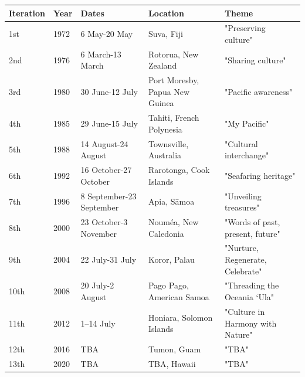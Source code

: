 \documentclass{article}
\begin{document}
\begin{tabular}{lllll}
\toprule
Iteration & Year & Dates & Location & Theme \\
\midrule
1st & 1972 & 6 May-20 May & Suva, Fiji & "Preserving culture" \\
2nd & 1976 & 6 March-13 March & Rotorua, New Zealand & "Sharing culture" \\
3rd & 1980 & 30 June-12 July & Port Moresby, Papua New Guinea & "Pacific awareness" \\
4th & 1985 & 29 June-15 July & Tahiti, French Polynesia & "My Pacific" \\
5th & 1988 & 14 August-24 August & Townsville, Australia & "Cultural interchange" \\
6th & 1992 & 16 October-27 October & Rarotonga, Cook Islands & "Seafaring heritage" \\
7th & 1996 & 8 September-23 September & Apia, Sāmoa & "Unveiling treasures" \\
8th & 2000 & 23 October-3 November & Nouméa, New Caledonia & "Words of past, present, future" \\
9th & 2004 & 22 July-31 July & Koror, Palau & "Nurture, Regenerate, Celebrate" \\
10th & 2008 & 20 July-2 August & Pago Pago, American Samoa & "Threading the Oceania ‘Ula" \\
11th & 2012 & 1–14 July & Honiara, Solomon Islands & "Culture in Harmony with Nature" \\
12th & 2016 & TBA & Tumon, Guam & "TBA" \\
13th & 2020 & TBA & TBA, Hawaii & "TBA" \\
\bottomrule
\end{tabular}
\end{document}
